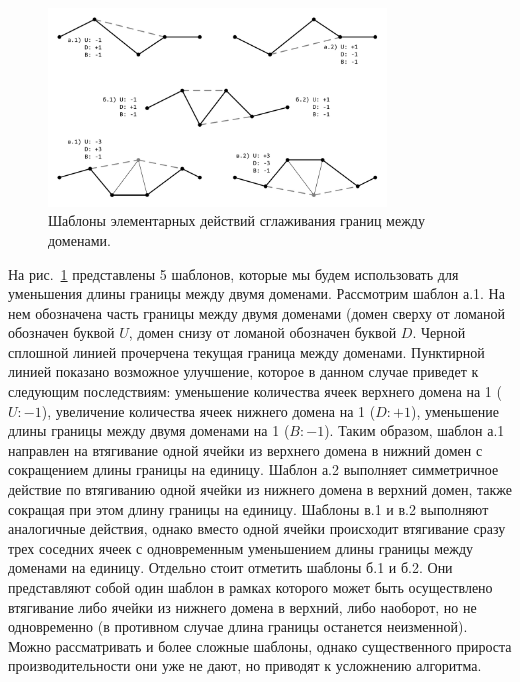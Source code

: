 \begin{figure}[ht]
\centering
\includegraphics[width=0.8\textwidth]{fig/par_smooth-border.pdf}
\singlespacing
{}\caption{Шаблоны элементарных действий сглаживания границ между доменами.}
\label{fig:text_2_smooth_smooth_border}
\end{figure}

На рис.~\ref{fig:text_2_smooth_smooth_border} представлены 5 шаблонов, которые мы будем использовать для уменьшения длины границы между двумя доменами.
Рассмотрим шаблон а.1.
На нем обозначена часть границы между двумя доменами (домен сверху от ломаной обозначен буквой $U$, домен снизу от ломаной обозначен буквой $D$.
Черной сплошной линией прочерчена текущая граница между доменами.
Пунктирной линией показано возможное улучшение, которое в данном случае приведет к следующим последствиям: уменьшение количества ячеек верхнего домена на 1 ($U: -1$), увеличение количества ячеек нижнего домена на 1 ($D: + 1$), уменьшение длины границы между двумя доменами на 1 ($B: -1$).
Таким образом, шаблон а.1 направлен на втягивание одной ячейки из верхнего домена в нижний домен с сокращением длины границы на единицу.
Шаблон а.2 выполняет симметричное действие по втягиванию одной ячейки из нижнего домена в верхний домен, также сокращая при этом длину границы на единицу.
Шаблоны в.1 и в.2 выполняют аналогичные действия, однако вместо одной ячейки происходит втягивание сразу трех соседних ячеек с одновременным уменьшением длины границы между доменами на единицу. Отдельно стоит отметить шаблоны б.1 и б.2.
Они представляют собой один шаблон в рамках которого может быть осуществлено втягивание либо ячейки из нижнего домена в верхний, либо наоборот, но не одновременно (в противном случае длина границы останется неизменной).
Можно рассматривать и более сложные шаблоны, однако существенного прироста производительности они уже не дают, но приводят к усложнению алгоритма.


